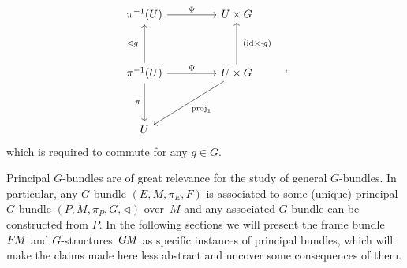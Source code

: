 \begin{equation}\label{cd:trivialization_principal_intro}
\begin{tikzcd}[row sep=3.5em, column sep=4.5em]
      \pi^{-1}(U)
            \arrow[r, "\Psi"]
    & U\times G
    \\
      \pi^{-1}(U)
            \arrow[d, "\pi\,"']
            \arrow[r, "\Psi"]
            \arrow[u, "\lhd g\ "]
    & U\times G
            \arrow[ld, "\proj_1"]
            \arrow[u, "\ (\id \times \cdot g)"']
    \\
    U
\end{tikzcd}
\quad,
\end{equation}
which is required to commute for any $g\in G$.

Principal $G$-bundles are of great relevance for the study of general $G$-bundles.
In particular, any $G$-bundle $(E,M,\pi_E,F)$ is associated to some (unique) principal $G$-bundle $(P,M,\pi_P,G,\lhd)$ over~$M$ and any associated $G$-bundle can be constructed from $P$.
In the following sections we will present the frame bundle~$F\mkern-1.5muM$ and $G$-structures~$G\mkern-1.4muM$ as specific instances of principal bundles, which will make the claims made here less abstract and uncover some consequences of them.










